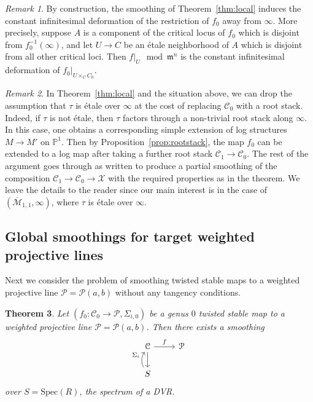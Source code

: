 \documentclass[11pt]{amsart}
\numberwithin{equation}{section}
\newtheorem{theorem}{Theorem}[section]
\theoremstyle{definition}
\theoremstyle{remark}
\newtheorem{remark}[theorem]{Remark}
\newcommand{\bP}{{\mathbb P}}
\newcommand{\calM}{\mathcal M}
\newcommand{\calX}{\mathcal X}
\newcommand{\calC}{\mathcal C}
\newcommand{\calP}{\mathcal P}
\newcommand{\Spec}{\mathrm{Spec}}
\begin{document}
\begin{remark} \label{rem:away} By construction, the smoothing of Theorem~\ref{thm:local} induces the constant infinitesimal deformation of the restriction of $f_0$ away from $\infty$. More precisely, suppose $A$ is a component of the critical locus of $f_0$ which is disjoint from $f_0^{-1}(\infty)$, and let $U \to C$ be an \'etale neighborhood of $A$ which is disjoint from all other critical loci. Then $f|_{U} \mod \mathfrak{m}^n$ is the constant infinitesimal deformation of $f_0|_{U \times_C C_0}$. 
\end{remark}

\begin{remark}\label{rem:rootstack} In Theorem~\ref{thm:local} and the situation above, we can drop the assumption that $\tau$ is \'etale over $\infty$ at the cost of replacing $\calC_0$ with a root stack. Indeed, if $\tau$ is not \'etale, then $\tau$ factors through a non-trivial root stack along $\infty$. In this case, one obtains a corresponding simple extension of log structures $M \to M'$ on $\bP^1$. Then by Proposition~\ref{prop:rootstack}, the map $f_0$ can be extended to a log map after taking a further root stack $\calC_1 \to \calC_0$. The rest of the argument goes through as written to produce a partial smoothing of the composition $\calC_1 \to \calC_0 \to \calX$ with the required properties as in the theorem. We leave the details to the reader since our main interest is in the case of $(\overline{\calM}_{1,1}, \infty)$, where $\tau$ is \'etale over $\infty$. 
\end{remark}


\subsection{Global smoothings for target weighted projective lines}

Next we consider the problem of smoothing twisted stable maps to a weighted projective line $\calP = \calP(a,b)$ without any tangency conditions.

\begin{theorem}\label{thm:smoothing1} Let $(f_0 \colon  \calC_0 \to \calP, \Sigma_{i,0})$ be a genus $0$ twisted stable map to a weighted projective line $\calP = \calP(a,b)$. Then there exists a smoothing 
\[ \begin{tikzcd}
\calC \arrow{r}{f}  \arrow[d] & \calP \\ 
  S \arrow[u, bend left, "\Sigma_i"] 
\end{tikzcd} \] 
over $S = \Spec (R)$, the spectrum of a DVR.  
\end{theorem} 
\end{document}
